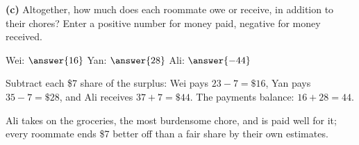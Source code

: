 \documentclass[12pt]{ximera}
\begin{document}
\begin{problem}
\begin{prompt}
\textbf{(c)} Altogether, how much does each roommate owe or receive, in addition to
their chores? Enter a positive number for money paid, negative for money received.

Wei: $\answer{16}$ \quad Yan: $\answer{28}$ \quad Ali: $\answer{-44}$

\begin{feedback}
Subtract each \$7 share of the surplus: Wei pays $23-7=\$16$, Yan pays $35-7=\$28$, and
Ali receives $37+7=\$44$. The payments balance: $16+28=44$. \checkmark

Ali takes on the groceries, the most burdensome chore, and is paid well for it; every
roommate ends \$7 better off than a fair share by their own estimates.
\end{feedback}
\end{prompt}
\end{problem}
\end{document}
